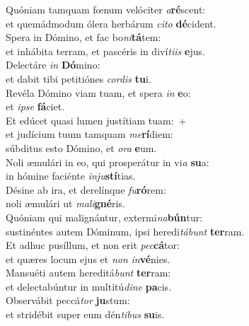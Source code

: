 \evenverse Quóniam tamquam fœnum velóciter \textit{a}\textbf{ré}scent:~\*\\
\evenverse et quemádmodum ólera herbárum \textit{ci}\textit{to} \textbf{dé}cident.\\
\oddverse Spera in Dómino, et fac bo\textit{ni}\textbf{tá}tem:~\*\\
\oddverse et inhábita terram, et pascéris in diví\textit{ti}\textit{is} \textbf{e}jus.\\
\evenverse Delectáre \textit{in} \textbf{Dó}mino:~\*\\
\evenverse et dabit tibi petitiónes \textit{cor}\textit{dis} \textbf{tu}i.\\
\oddverse Revéla Dómino viam tuam, et spera \textit{in} \textbf{e}o:~\*\\
\oddverse et \textit{i}\textit{pse} \textbf{fá}ciet.\\
\evenverse Et edúcet quasi lumen justítiam tuam:~+\\
\evenverse  et judícium tuum tamquam \textit{me}\textbf{rí}diem:~\*\\
\evenverse súbditus esto Dómino, et \textit{o}\textit{ra} \textbf{e}um.\\
\oddverse Noli æmulári in eo, qui prosperátur in vi\textit{a} \textbf{su}a:~\*\\
\oddverse in hómine faciénte \textit{in}\textit{ju}\textbf{stí}tias.\\
\evenverse Désine ab ira, et derelínque \textit{fu}\textbf{ró}rem:~\*\\
\evenverse noli æmulári ut \textit{ma}\textit{li}\textbf{gné}ris.\\
\oddverse Quóniam qui malignántur, extermi\textit{na}\textbf{bún}tur:~\*\\
\oddverse sustinéntes autem Dóminum, ipsi heredi\textit{tá}\textit{bunt} \textbf{ter}ram.\\
\evenverse Et adhuc pusíllum, et non erit \textit{pec}\textbf{cá}tor:~\*\\
\evenverse et quæres locum ejus et \textit{non} \textit{in}\textbf{vé}nies.\\
\oddverse Mansuéti autem hereditá\textit{bunt} \textbf{ter}ram:~\*\\
\oddverse et delectabúntur in multitú\textit{di}\textit{ne} \textbf{pa}cis.\\
\evenverse Observábit peccá\textit{tor} \textbf{ju}stum:~\*\\
\evenverse et stridébit super eum dén\textit{ti}\textit{bus} \textbf{su}is.\\
